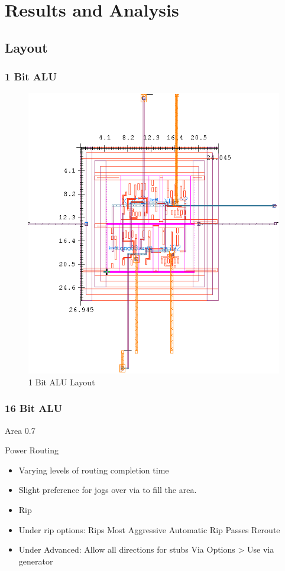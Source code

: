 \documentclass[11pt]{article}
\begin{document}
\section{Results and Analysis}
		
		
	\subsection{Layout}
	
		\subsubsection{1 Bit ALU}
		
			\begin{figure}[H]
				\centering
				\includegraphics[width=0.7\linewidth]{"Pictures/ALU 1-Bit Layout"}
				\caption{1 Bit ALU Layout}
				\label{fig:alu-1bit-layout}
			\end{figure}
			
	
		\subsubsection{16 Bit ALU}
			
			Area 0.7
			
			Power Routing
			\begin{itemize}
				\item Varying levels of routing completion time
				\item Slight preference for jogs over via to fill the area.
				\item Rip
				\item Under rip options: 
				\subitem Rips Most Aggressive
				\subitem Automatic Rip Passes
				\subitem Reroute
				\item Under Advanced:
				\subitem Allow all directions for stubs
				\subitem Via Options > Use via generator
			\end{itemize}
		
\end{document}
